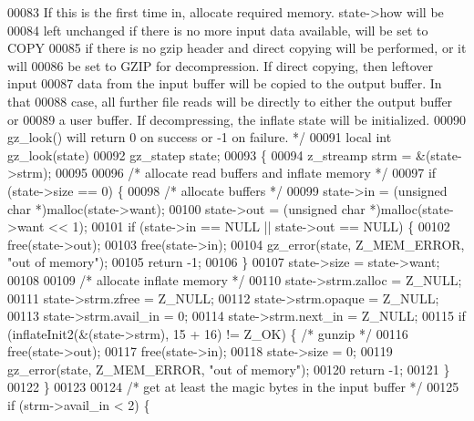 \begin{DoxyCode}
00083 \textcolor{comment}{   If this is the first time in, allocate required memory.  state->how will be}
00084 \textcolor{comment}{   left unchanged if there is no more input data available, will be set to COPY}
00085 \textcolor{comment}{   if there is no gzip header and direct copying will be performed, or it will}
00086 \textcolor{comment}{   be set to GZIP for decompression.  If direct copying, then leftover input}
00087 \textcolor{comment}{   data from the input buffer will be copied to the output buffer.  In that}
00088 \textcolor{comment}{   case, all further file reads will be directly to either the output buffer or}
00089 \textcolor{comment}{   a user buffer.  If decompressing, the inflate state will be initialized.}
00090 \textcolor{comment}{   gz\_look() will return 0 on success or -1 on failure. */}
00091 local \textcolor{keywordtype}{int} gz\_look(state)
00092     gz\_statep state;
00093 \{
00094     z\_streamp strm = &(state->strm);
00095 
00096     \textcolor{comment}{/* allocate read buffers and inflate memory */}
00097     \textcolor{keywordflow}{if} (state->size == 0) \{
00098         \textcolor{comment}{/* allocate buffers */}
00099         state->in = (\textcolor{keywordtype}{unsigned} \textcolor{keywordtype}{char} *)malloc(state->want);
00100         state->out = (\textcolor{keywordtype}{unsigned} \textcolor{keywordtype}{char} *)malloc(state->want << 1);
00101         \textcolor{keywordflow}{if} (state->in == NULL || state->out == NULL) \{
00102             free(state->out);
00103             free(state->in);
00104             gz\_error(state, Z\_MEM\_ERROR, \textcolor{stringliteral}{"out of memory"});
00105             \textcolor{keywordflow}{return} -1;
00106         \}
00107         state->size = state->want;
00108 
00109         \textcolor{comment}{/* allocate inflate memory */}
00110         state->strm.zalloc = Z\_NULL;
00111         state->strm.zfree = Z\_NULL;
00112         state->strm.opaque = Z\_NULL;
00113         state->strm.avail\_in = 0;
00114         state->strm.next\_in = Z\_NULL;
00115         \textcolor{keywordflow}{if} (inflateInit2(&(state->strm), 15 + 16) != Z\_OK) \{    \textcolor{comment}{/* gunzip */}
00116             free(state->out);
00117             free(state->in);
00118             state->size = 0;
00119             gz\_error(state, Z\_MEM\_ERROR, \textcolor{stringliteral}{"out of memory"});
00120             \textcolor{keywordflow}{return} -1;
00121         \}
00122     \}
00123 
00124     \textcolor{comment}{/* get at least the magic bytes in the input buffer */}
00125     \textcolor{keywordflow}{if} (strm->avail\_in < 2) \{

\end{DoxyCode}
